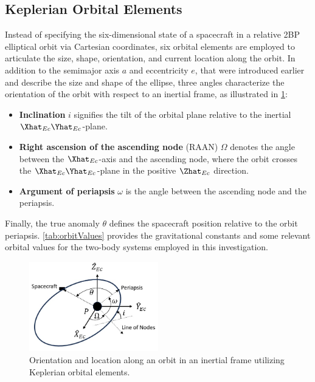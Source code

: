 \subsection{Keplerian Orbital Elements}
Instead of specifying the six-dimensional state of a spacecraft in a relative 2BP elliptical orbit
via Cartesian coordinates, six orbital elements are employed to articulate the size, shape,
orientation, and current location along the orbit. In addition to the semimajor axis $a$ and
eccentricity $e$, that were introduced earlier and describe the size and shape of the ellipse,
three angles characterize the orientation of the orbit with respect to an inertial frame, as
illustrated in \cref{fig:orbitalElements}:
\begin{itemize}
    \item \textbf{Inclination} $i$ signifies the tilt of the orbital plane relative to the inertial
    $\Xhat_{Ec}\Yhat_{Ec}$-plane.
    \item \textbf{Right ascension of the ascending node} (RAAN) $\Omega$ denotes the angle between
    the $\Xhat_{Ec}$-axis and the ascending node, where the orbit crosses the
    $\Xhat_{Ec}\Yhat_{Ec}$-plane in the positive $\Zhat_{Ec}$ direction.
    \item \textbf{Argument of periapsis} $\omega$ is the angle between the ascending node and the
    periapsis.
\end{itemize}
Finally, the true anomaly $\theta$ defines the spacecraft position relative to the orbit periapsis.
\cref{tab:orbitValues} provides the gravitational constants and some relevant orbital values for
the two-body systems employed in this investigation.

\begin{figure}[H]
    \centering
    \includegraphics[width=0.5\textwidth]{figures/OrbitalElements.jpg}
    \caption{Orientation and location along an orbit in an inertial frame utilizing Keplerian orbital elements.}
    \label{fig:orbitalElements}
\end{figure}

